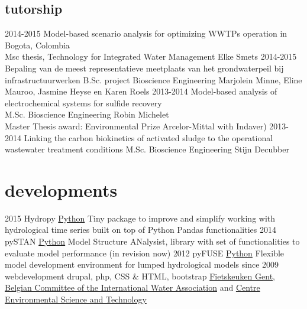 \documentclass[]{friggeri-cv}  %
\begin{document}
\subsection*{tutorship}
\begin{entrylist}
  \entry
    {2014-2015}
    {Model-based scenario analysis for optimizing WWTPs operation in Bogota, Colombia\\}
    {Msc thesis, Technology for Integrated Water Management}
    {Elke Smets }
  \entry
    {2014-2015}
    {Bepaling van de meest representatieve meetplaats van het grondwaterpeil bij infrastructuurwerken}
    {B.Sc. project Bioscience Engineering}
    {Marjolein Minne, Eline Mauroo, Jasmine Heyse en Karen Roels}
   \entry
    {2013-2014}
    {Model-based analysis of electrochemical systems for sulfide recovery\\}
    {M.Sc. Bioscience Engineering}
    {Robin Michelet\\ \small{Master Thesis award: Environmental Prize Arcelor-Mittal with Indaver)}}
   \entry
    {2013-2014}
    {Linking the carbon biokinetics of activated sludge to the operational wastewater treatment conditions}
    {M.Sc. Bioscience Engineering}
    {Stijn Decubber}
\end{entrylist}

\pagebreak
\section{developments}
\begin{entrylist}
  \entry
    {2015}
    {Hydropy}
    {\href{https://stijnvanhoey.github.io/hydropy/}{Python}}
    {Tiny package to improve and simplify working with hydrological time series built on top of Python Pandas functionalities}
  \entry
    {2014}
    {pySTAN}
    {\href{https://github.ugent.be/biomath/pySTAN}{Python}}
    {Model Structure ANalysist, library with set of functionalities to evaluate model performance (in revision now)}
  \entry
    {2012}
    {pyFUSE}
    {\href{https://github.ugent.be/biomath/pyFUSE}{Python}}
    {Flexible model development environment for lumped hydrological models}
  \entry
    {since 2009}
    {webdevelopment}
    {drupal, php, CSS \& HTML, bootstrap}
    {\href{http://www.fietskeuken.org}{Fietskeuken Gent}, \href{http://www.b-iwa.be/}{Belgian Committee of the International Water Association} and \href{http://www.cest.ugent.be/}{Centre Environmental Science and Technology}}
\end{entrylist}

\end{document}
